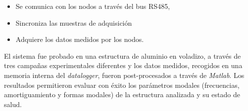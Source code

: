 \begin{itemize}
	\item Se comunica con los nodos a través del bus RS485, 
	\item Sincroniza las muestras de adquisición
	\item Adquiere los datos medidos por los nodos.
\end{itemize} 

El sistema fue probado en una estructura de aluminio en voladizo, a través de tres campañas experimentales diferentes y los datos medidos, recogidos en una memoria interna del \textit{datalogger}, fueron post-procesados a través de \textit{Matlab}. Los resultados permitieron evaluar con éxito los parámetros modales (frecuencias, amortiguamiento y formas modales) de la estructura analizada y su estado de salud.

